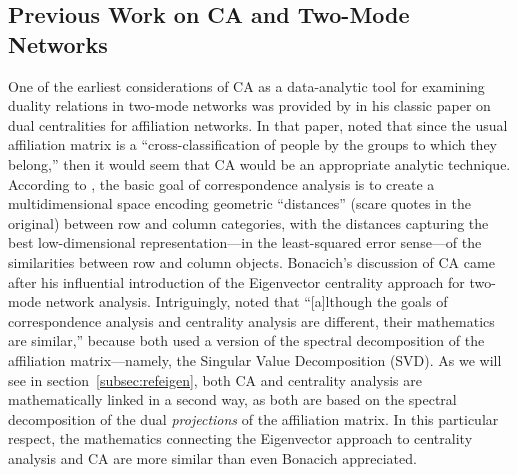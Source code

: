 \documentclass[a4paper,fleqn]{cas-sc}
\begin{document}

\subsection{Previous Work on CA and Two-Mode Networks}
One of the earliest considerations of CA as a data-analytic tool for examining duality relations in two-mode networks was provided by \citet[163-165]{bonacich1991simultaneous} in his classic paper on dual centralities for affiliation networks. In that paper, \citet{bonacich1991simultaneous} noted that since the usual affiliation matrix is a ``cross-classification of people by the groups to which they belong,'' then it would seem that CA would be an appropriate analytic technique. According to \citet{bonacich1991simultaneous}, the basic goal of correspondence analysis is to create a multidimensional space encoding geometric ``distances'' (scare quotes in the original) between row and column categories, with the distances capturing the best low-dimensional representation---in the least-squared error sense---of the similarities between row and column objects.  Bonacich's discussion of CA came after his influential introduction of the Eigenvector centrality approach for two-mode network analysis. Intriguingly, \citet[163]{bonacich1991simultaneous} noted that ``[a]lthough the goals of correspondence analysis and centrality analysis are different, their mathematics are similar,'' because both used a version of the spectral decomposition of the affiliation matrix---namely, the Singular Value Decomposition (SVD). As we will see in section~\ref{subsec:refeigen}, both CA and centrality analysis are mathematically linked in a second way, as both are based on the spectral decomposition of the dual \textit{projections} of the affiliation matrix. In this particular respect, the mathematics connecting the Eigenvector approach to centrality analysis and CA are more similar than even Bonacich appreciated. 
\end{document}
